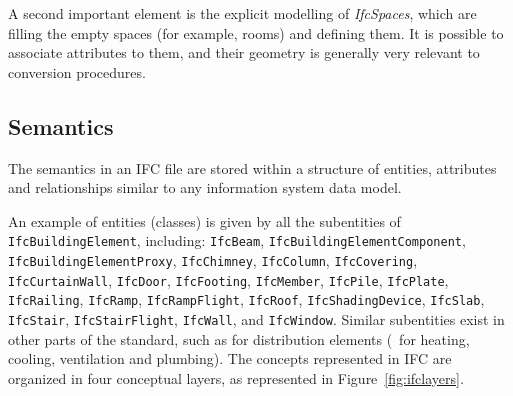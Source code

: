 A second important element is the explicit modelling of \textit{IfcSpaces}, which are filling the empty spaces (for example, rooms) and defining them.
It is possible to associate attributes to them, and their geometry is generally very relevant to conversion procedures.

\subsection{Semantics}

The semantics in an IFC file are stored within a structure of entities, attributes and relationships similar to any information system data model.

An example of entities (classes) is given by all the subentities of \texttt{IfcBuildingElement}, including: \texttt{IfcBeam}, \texttt{IfcBuildingElementComponent}, \texttt{IfcBuildingElementProxy}, \texttt{Ifc\-Chim\-ney}, \texttt{Ifc\-Co\-lumn}, \texttt{IfcCovering}, \texttt{IfcCurtainWall}, \texttt{IfcDoor}, \texttt{IfcFooting}, \texttt{IfcMember}, \texttt{IfcPile}, \texttt{Ifc\-Plate}, \texttt{Ifc\-Rai\-ling}, \texttt{IfcRamp}, \texttt{Ifc\-Ramp\-Flight}, \texttt{IfcRoof}, \texttt{IfcShadingDevice}, \texttt{IfcSlab}, \texttt{Ifc\-Stair}, \texttt{Ifc\-Stair\-Flight}, \texttt{IfcWall}, and \texttt{Ifc\-Win\-dow}.
%
Similar subentities exist in other parts of the standard, such as for distribution elements (\eg\ for heating, cooling, ventilation and plumbing).
The concepts represented in IFC are organized in four conceptual layers, as represented in Figure~\ref{fig:ifclayers}.

